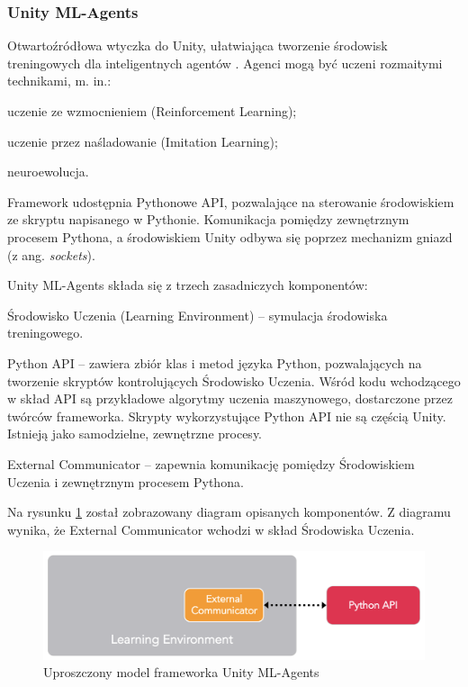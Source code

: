 \subsubsection{Unity ML-Agents}
\label{UnityMlaDescription}
Otwartoźródłowa wtyczka do Unity, ułatwiająca tworzenie środowisk treningowych dla inteligentnych agentów \cite{unitymla:overview}. Agenci mogą być uczeni rozmaitymi technikami, m. in.:
\begin{itemize*}
\item uczenie ze wzmocnieniem (Reinforcement Learning);
\item uczenie przez naśladowanie (Imitation Learning);
\item neuroewolucja.
\end{itemize*}
Framework udostępnia Pythonowe API, pozwalające na sterowanie środowiskiem ze skryptu napisanego w Pythonie. Komunikacja pomiędzy zewnętrznym procesem Pythona, a środowiskiem Unity odbywa się poprzez mechanizm gniazd (z ang. \textit{sockets}).

Unity ML-Agents składa się z trzech zasadniczych komponentów:
\begin{enumerate*}
\item Środowisko Uczenia (Learning Environment) -- symulacja środowiska treningowego.
\item Python API -- zawiera zbiór klas i metod języka Python, pozwalających na tworzenie skryptów kontrolujących Środowisko Uczenia. Wśród kodu wchodzącego w skład API są przykładowe algorytmy uczenia maszynowego, dostarczone przez twórców frameworka. Skrypty wykorzystujące Python API nie są częścią Unity. Istnieją jako samodzielne, zewnętrzne procesy.
\item External Communicator -- zapewnia komunikację pomiędzy Środowiskiem Uczenia i zewnętrznym procesem Pythona.
\end{enumerate*}
Na rysunku \ref{UnityMlaBasicModel} został zobrazowany diagram opisanych komponentów.
Z diagramu wynika, że External Communicator wchodzi w skład Środowiska Uczenia.

\begin{figure}[h]
\begin{center}
\includegraphics[width=15cm]{resources/figures/unitymla_basic_architecture.png}
\caption{Uproszczony model frameworka Unity ML-Agents}
\label{UnityMlaBasicModel}
\end{center}
\end{figure}

